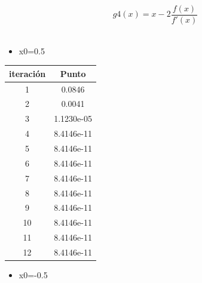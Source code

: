 \documentclass{udparticle}
\begin{document}
\begin{enumerate}
\begin{enumerate}
\begin{table}[H]
\begin{tabular} { |c|c|}
        \end{tabular}
        
    \end{table}
 \vspace{2cm}
     \begin{equation}
 g4(x) = x-2\frac{f(x)}
{f'(x)}
\end{equation}
\\
 \begin{itemize}
\item x0=0.5
\end{itemize}

\begin{table}[H]
    \centering
        \begin{tabular} { |c|c|}
        
        \hline
        iteración  &  Punto\\
        \hline
        1 &      0.0846   \\
         \hline
        2 &    0.0041    \\
         \hline
        3 &   1.1230e-05 \\
         \hline
        4 &   8.4146e-11    \\
         \hline
        5 &   8.4146e-11   \\
         \hline
        6 &   8.4146e-11     \\
         \hline
        7 & 8.4146e-11   \\
         \hline
        8 &  8.4146e-11   \\
         \hline
        9 &   8.4146e-11      \\
         \hline
        10 &   8.4146e-11      \\
         \hline
        11 & 8.4146e-11   \\
         \hline
        12 &  8.4146e-11      \\
        \hline
        
        \end{tabular}
        
    \end{table}
     \begin{itemize}
\item x0=-0.5
\end{itemize}

\begin{table}[H]
    \centering
        \begin{tabular} { |c|c|}
        

\end{tabular}
\end{table}
\end{enumerate}
\end{enumerate}
\end{document}
